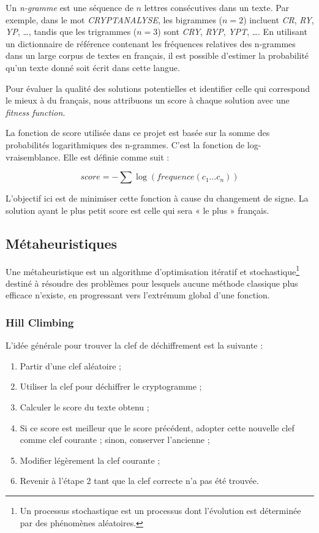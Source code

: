 \documentclass[a4paper]{article}
\begin{document}
Un \textit{n-gramme} est une séquence de $n$ lettres consécutives dans un texte. Par exemple, dans le mot \textit{CRYPTANALYSE}, les bigrammes ($n=2$) incluent \textit{CR}, \textit{RY}, \textit{YP}, \ldots, tandis que les trigrammes ($n=3$) sont \textit{CRY}, \textit{RYP}, \textit{YPT}, \ldots.  
En utilisant un dictionnaire de référence contenant les fréquences relatives des n-grammes dans un large corpus de textes en français, il est possible d’estimer la probabilité qu’un texte donné soit écrit dans cette langue.

Pour évaluer la qualité des solutions potentielles et identifier celle qui correspond le mieux à du français, nous attribuons un score à chaque solution avec une \textit{fitness function}.

La fonction de score utilisée dans ce projet est basée sur la somme des probabilités logarithmiques des n-grammes. C’est la fonction de log-vraisemblance. Elle est définie comme suit :

\[
score = - \sum \log(frequence(c_1 \ldots c_n))
\]

L’objectif ici est de minimiser cette fonction à cause du changement de signe. La solution ayant le plus petit score est celle qui sera « le plus » français.

\subsection{Métaheuristiques}

Une métaheuristique est un algorithme d’optimisation itératif et stochastique\footnote{Un processus stochastique est un processus dont l’évolution est déterminée par des phénomènes aléatoires.} destiné à résoudre des problèmes pour lesquels aucune méthode classique plus efficace n'existe, en progressant vers l’extrémum global d’une fonction.

\subsubsection{Hill Climbing}

L’idée générale pour trouver la clef de déchiffrement est la suivante :
\begin{enumerate}
    \item Partir d’une clef aléatoire ;
    \item Utiliser la clef pour déchiffrer le cryptogramme ;
    \item Calculer le score du texte obtenu ;
    \item Si ce score est meilleur que le score précédent, adopter cette nouvelle clef comme clef courante ; sinon, conserver l’ancienne ;
    \item Modifier légèrement la clef courante ;
    \item Revenir à l’étape 2 tant que la clef correcte n’a pas été trouvée.
\end{enumerate}
\end{document}
